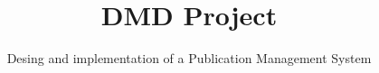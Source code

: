 \documentclass{acm_proc_article-sp}
\begin{document}
\title{{\ttlit DMD} Project}
\subtitle{Desing and implementation of a Publication Management System}
%
%
%
%
%
\end{document}
